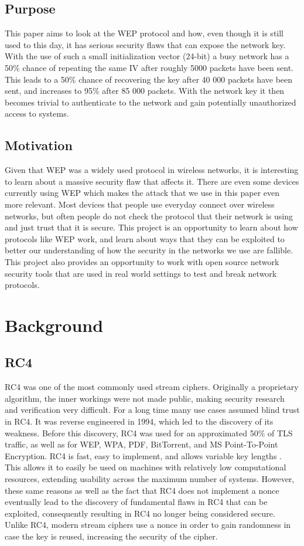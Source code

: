 \documentclass[10pt, titlepage]{article}
\begin{document}
\subsection{Purpose}
This paper aims to look at the WEP protocol and how, even though it is still used to this day, it has serious security flaws that can expose the network key. With the use of such a small initialization vector (24-bit) a busy network has a 50\% chance of repeating the same IV after roughly 5000 packets have been sent. This leads to a 50\% chance of recovering the key after 40 000 packets have been sent, and increases to 95\% after 85 000 packets. With the network key it then becomes trivial to authenticate to the network and gain potentially unauthorized access to systems.

\subsection{Motivation}
Given that WEP was a widely used protocol in wireless networks, it is interesting to learn about a massive security flaw that affects it. There are even some devices currently using WEP which makes the attack that we use in this paper even more relevant. Most devices that people use everyday connect over wireless networks, but often people do not check the protocol that their network is using and just trust that it is secure. This project is an opportunity to learn about how protocols like WEP work, and learn about ways that they can be exploited to better our understanding of how the security in the networks we use are fallible. This project also provides an opportunity to work with open source network security tools that are used in real world settings to test and break network protocols.




\section{Background}
\subsection{RC4}
RC4 was one of the most commonly used stream ciphers. Originally a proprietary algorithm, the inner workings were not made public, making security research and verification very difficult. For a long time many use cases assumed blind trust in RC4. It was reverse engineered in 1994, which led to the discovery of its weakness. Before this discovery, RC4 was used for an approximated 50\% of TLS traffic, as well as for WEP, WPA, PDF, BitTorrent, and MS Point-To-Point Encryption. RC4 is fast, easy to implement, and allows variable key lengths \cite{appliedCrypto}. This allows it to easily be used on machines with relatively low computational resources, extending usability across the maximum number of systems. However, these same reasons as well as the fact that RC4 does not implement a nonce eventually lead to the discovery of fundamental flaws in RC4 that can be exploited, consequently resulting in RC4 no longer being considered secure. Unlike RC4, modern stream ciphers use a nonce in order to gain randomness in case the key is reused, increasing the security of the cipher.
\end{document}
